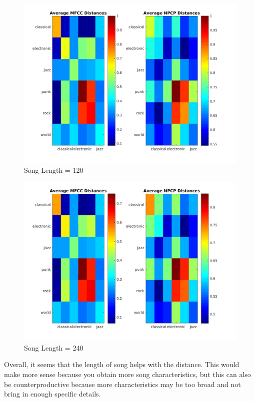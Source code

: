 \documentclass[11pt, a4paper]{article}
\begin{document}
\begin{figure}[H]
\hspace*{-2cm}    
    \centering
    \includegraphics[width=1.25\textwidth]{average30.png}
    \caption{Song Length = 120}
\end{figure}


\begin{figure}[H]
\hspace*{-2cm}    
    \centering
    \includegraphics[width=1.25\textwidth]{length240.png}
    \caption{Song Length = 240}
\end{figure}

Overall, it seems that the length of song helps with the distance. This would make more sense because you obtain more song characteristics, but this can also be counterproductive because more characteristics may be too broad and not bring in enough specific details.
\end{document}
